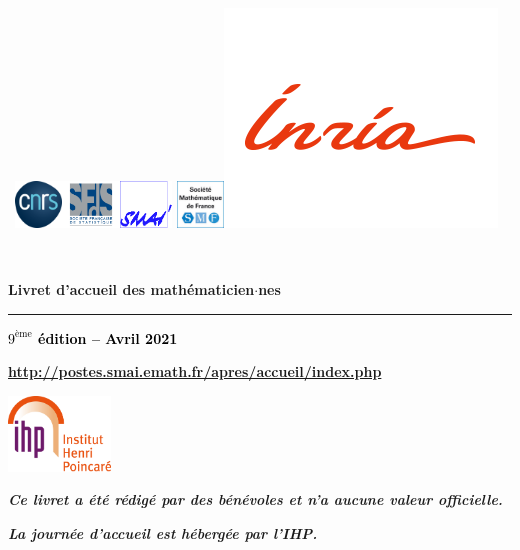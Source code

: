 \documentclass[11pt]{book}
\newcommand{\verifier}[1]{\textcolor{black}{#1}}
\begin{document}
\renewcommand{\labelitemi}{$\bullet$}
\setlength{\parindent}{0cm}

{\pagestyle{empty}
%
~\hfill\includegraphics[height=1.25cm]{Images/CNRS}\hfill\includegraphics[height=1.25cm]{Images/sfds}\hfill\includegraphics[height=1.25cm]{Images/SMAI}
\hfill\includegraphics[height=1.25cm]{Images/smf}\hfill\includegraphics[height=1.cm]{Images/inria_fr}\hfill~

~

\vfill

\textbf{\Huge Livret d'accueil des math\'ematicien$\cdot$nes}

\hrule

\begin{flushright}
\textbf{\Large \verifier{$9^\text{\`eme}$ \'edition -- Avril 2021}}
\end{flushright}

\vskip 2cm

\begin{center}

\textbf{\large \href{http\string://postes.smai.emath.fr/apres/accueil/index.php}{http\string://postes.smai.emath.fr/apres/accueil/index.php}}

\vfill

\includegraphics[height=2cm]{Images/IHP} 

\bigskip

\textit{\textbf{Ce livret a \'et\'e r\'edig\'e par des b\'en\'evoles
et n'a aucune valeur officielle.}}

\textit{\textbf{La journ\'ee d'accueil est h\'eberg\'ee par l'IHP.}}

\end{center}

\newpage

~

\newpage

\tableofcontents

\newpage
}
\end{document}

